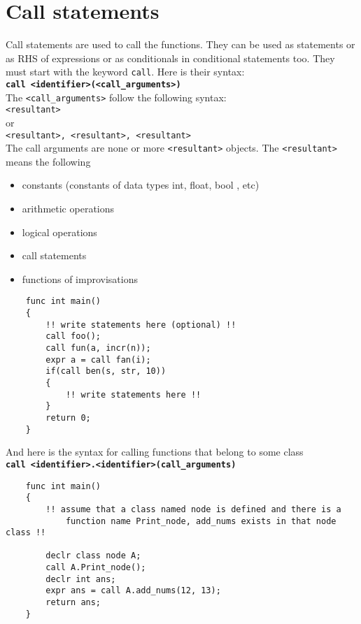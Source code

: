 \documentclass[journal, 18pt]{report}
\begin{document}
\section{Call statements}
Call statements are used to call the functions. They can be used as statements or as RHS of expressions or as conditionals in conditional statements too. They must start with the keyword \texttt{call}. Here is their syntax:\\
\textbf{\texttt{call <identifier>(<call\_arguments>)}} \\
The \texttt{<call\_arguments>} follow the following syntax:\\
\texttt{<resultant>}\\ 
or\\
\texttt{<resultant>, <resultant>, <resultant>}\\
The call arguments are none or more \texttt{<resultant>} objects. The \texttt{<resultant>} means the following
\begin{itemize}
    \item constants (constants of data types int, float, bool , etc)
    \item arithmetic operations
    \item logical operations
    \item call statements
    \item functions of improvisations
\end{itemize}
\begin{lstlisting}
    func int main()
    {
        !! write statements here (optional) !!
        call foo();
        call fun(a, incr(n));
        expr a = call fan(i);
        if(call ben(s, str, 10))
        {
            !! write statements here !!
        }
        return 0;
    }
\end{lstlisting}

And here is the syntax for calling functions that belong to some class
\\
\textbf{\texttt{call <identifier>.<identifier>(call\_arguments)}}
\begin{lstlisting}
    func int main()
    {
        !! assume that a class named node is defined and there is a 
            function name Print_node, add_nums exists in that node class !!

        declr class node A;
        call A.Print_node();
        declr int ans;
        expr ans = call A.add_nums(12, 13);
        return ans;
    }
\end{lstlisting}
\end{document}
